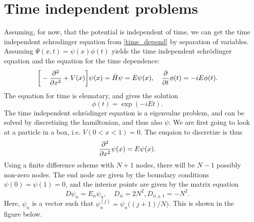 \documentclass{article}
\begin{document}
    \section*{Time independent problems}
    Assuming, for now, that the potential is independent of time, we can get the time independent schrødinger equation from \eqref{time_depend} by separation of variables. Assuming $\Psi(x, t) = \psi(x)\phi(t)$  yields the time independent schrödinger equation and the equation for the time dependence:
    \begin{equation}
        \bigg[-\pdv[2]{x} + V(x) \bigg] \psi(x) = \hat H \psi = E \psi(x), \quad \pdv{t}\phi(t) = -iE\phi(t).
    \end{equation}
    The equation for time is elematary, and gives the solution
    \begin{equation*}
        \phi(t) = \exp(-iEt).
    \end{equation*}
    The time independent schrödinger equation is a eigenvalue problem, and can be solved by discretizing the hamiltonian, and thus also $\psi$. We are first going to look at a particle in a box, i.e. $V(0<x<1) = 0$. The euqaion to discretize is thus
    \begin{equation*}
        \pdv[2]{x}\psi(x) = E \psi(x).
    \end{equation*}
    Using a finite difference scheme with $N + 1$ nodes, there will be $N-1$ possibly non-zero nodes. The end node are given by the boundary conditions $\psi(0) = \psi(1) = 0$, and the interior points are given by the matrix equation
    \begin{equation*}
        D \psi_n = E_n \psi_n, \quad D_{ii} = 2N^2, D_{ii\pm1} = -N^2.
    \end{equation*}
    Here, $\psi_n$ is a vector such that $\psi_n^{(j)} = \psi_n\big((j+1)/N\big)$. This is shown in the figure below.

    \vspace{10pt}
    {\centering
    }
    \vspace{10pt}
\end{document}
